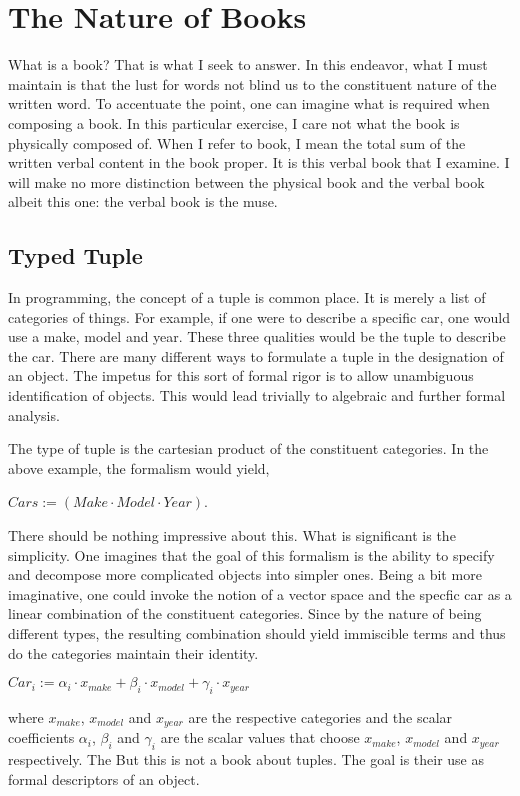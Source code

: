 \documentclass[12pt]{article}
\begin{document}
\section{The Nature of Books}
What is a book? That is what I seek to answer. In this endeavor, what I must
maintain is that the lust for words not blind us to the constituent nature of
the written word. To accentuate the point, one can imagine what is required when
composing a book. In this particular exercise, I care not what the book is
physically composed of. When I refer to book, I mean the total sum of the
written verbal content in the book proper. It is this verbal book that I
examine. I will make no more distinction between the physical book and the
verbal book albeit this one: the verbal book is the muse.

\subsection{Typed Tuple}
In programming, the concept of a tuple is common place. It is merely a list of
categories of things. For example, if one were to describe a specific car, one
would use a make, model and year. These three qualities would be the tuple to
describe the car. There are many different ways to formulate a tuple in the
designation of an object. The impetus for this sort of formal rigor is to allow
unambiguous identification of objects. This would lead trivially to algebraic and
further formal analysis.

The type of tuple is the cartesian product of the constituent categories. In the
above example, the formalism would yield,

$Cars := (Make \cdot Model \cdot Year)$. 

There should be nothing impressive about this. What is significant is the
simplicity. One imagines that the goal of this formalism is the ability to
specify and decompose more complicated objects into simpler ones. Being a bit
more imaginative, one could invoke the notion of a vector space and the specfic
car as a linear combination of the constituent categories. Since by the nature
of being different types, the resulting combination should yield immiscible
terms and thus do the categories maintain their identity.

$ Car_i := \alpha_i \cdot x_{make} + \beta_i \cdot x_{model} + \gamma_i \cdot x_{year} $ 

where $x_{make}$, $x_{model}$ and $x_{year}$ are the respective categories and
the scalar coefficients $\alpha_i$, $\beta_i$ and $\gamma_i$ are the scalar
values that choose $x_{make}$, $x_{model}$ and $x_{year}$ respectively. The But this is not a book
about tuples. The goal is their use as formal descriptors of an object.
\end{document}
